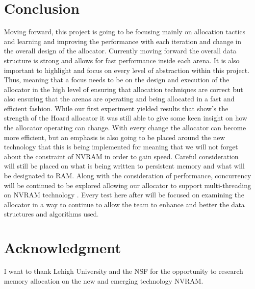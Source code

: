 \documentclass[conference]{IEEEtran}
\begin{document}
\section{Conclusion}
Moving forward, this project is going to be focusing mainly on allocation tactics and learning and improving the performance with each iteration and change in the overall design of the allocator. Currently moving forward the overall data structure is strong and allows for fast performance inside each arena. It is also important to highlight and focus on every level of abstraction within this project. Thus, meaning that a focus needs to be on the design and execution of the allocator in the high level of ensuring that allocation techniques are correct but also ensuring that the arenas are operating and being allocated in a fast and efficient fashion. While our first experiment yielded results that show’s the strength of the Hoard allocator it was still able to give some keen insight on how the allocator operating can change. With every change the allocator can become more efficient, but an emphasis is also going to be placed around the new technology that this is being implemented for meaning that we will not forget about the constraint of NVRAM in order to gain speed. Careful consideration will still be placed on what is being written to persistent memory and what will be designated to RAM. Along with the consideration of performance, concurrency will be continued to be explored allowing our allocator to support multi-threading on NVRAM technology \cite{xiang-ppopp-2013}. Every test here after will be focused on examining the allocator in a way to continue to allow the team to enhance and better the data structures and algorithms used. 

\section{Acknowledgment}

I want to thank Lehigh University and the NSF for the opportunity to research memory allocation on the new and emerging technology NVRAM.  







\vspace{12pt}
\end{document}

